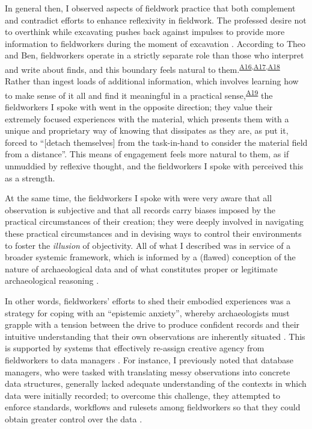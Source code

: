 \documentclass[
]{article}
\begin{document}
In general then, I observed aspects of fieldwork practice that both
complement and contradict efforts to enhance reflexivity in fieldwork.
The professed desire not to overthink while excavating pushes back
against impulses to provide more information to fieldworkers during the
moment of excavation \autocites[cf.][]{berggren2012,berggren2015}.
According to Theo and Ben, fieldworkers operate in a strictly separate
role than those who interpret and write about finds, and this boundary
feels natural to
them.\textsuperscript{\hyperref[sec-A16]{A16},\hyperref[sec-A17]{A17},\hyperref[sec-A18]{A18}}
Rather than ingest loads of additional information, which involves
learning how to make sense of it all and find it meaningful in a
practical sense,\textsuperscript{\hyperref[sec-A19]{A19}} the
fieldworkers I spoke with went in the opposite direction; they value
their extremely focused experiences with the material, which presents
them with a unique and proprietary way of knowing that dissipates as
they are, as \textcite[109]{edgeworth2003} put it, forced to ``{[}detach
themselves{]} from the task-in-hand to consider the material field from
a distance''. This means of engagement feels more natural to them, as if
unmuddied by reflexive thought, and the fieldworkers I spoke with
perceived this as a strength.

At the same time, the fieldworkers I spoke with were very aware that all
observation is subjective and that all records carry biases imposed by
the practical circumstances of their creation; they were deeply involved
in navigating these practical circumstances and in devising ways to
control their environments to foster the \emph{illusion} of objectivity.
All of what I described was in service of a broader systemic framework,
which is informed by a (flawed) conception of the nature of
archaeological data and of what constitutes proper or legitimate
archaeological reasoning \autocite{batist-alienation}.

In other words, fieldworkers' efforts to shed their embodied experiences
was a strategy for coping with an ``epistemic anxiety'', whereby
archaeologists must grapple with a tension between the drive to produce
confident records and their intuitive understanding that their own
observations are inherently situated
\autocites[274-278]{huggett2022a}[55-57]{lucas2019}{wylie2017,batist2024a}.
This is supported by systems that effectively re-assign creative agency
from fieldworkers to data managers
\autocite{batist2024a,batist-alienation}. For instance, I previously
noted that database managers, who were tasked with translating messy
observations into concrete data structures, generally lacked adequate
understanding of the contexts in which data were initially recorded; to
overcome this challenge, they attempted to enforce standards, workflows
and rulesets among fieldworkers so that they could obtain greater
control over the data \autocite{batist2024a}.
\end{document}
